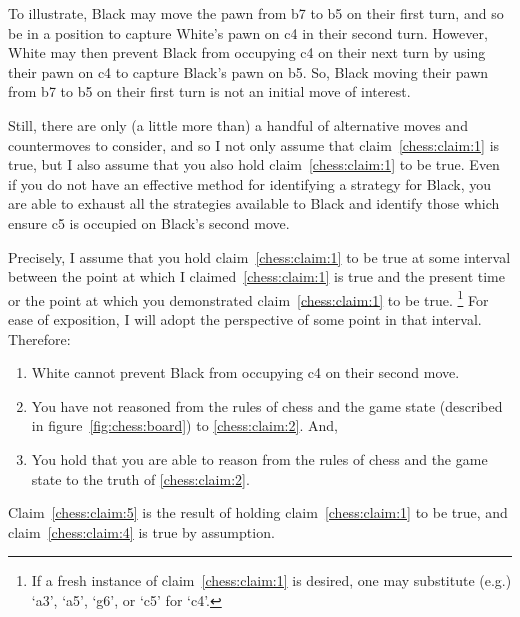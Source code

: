 \documentclass[10pt]{article}
\begin{document}
To illustrate, Black may move the pawn from b7 to b5 on their first turn, and so be in a position to capture White's pawn on c4 in their second turn.
However, White may then prevent Black from occupying c4 on their next turn by using their pawn on c4 to capture Black's pawn on b5.
So, Black moving their pawn from b7 to b5 on their first turn is not an initial move of interest.

Still, there are only (a little more than) a handful of alternative moves and countermoves to consider, and so I not only assume that claim~\ref{chess:claim:1} is true, but I also assume that you also hold claim~\ref{chess:claim:1} to be true.
Even if you do not have an effective method for identifying a strategy for Black, you are able to exhaust all the strategies available to Black and identify those which ensure c5 is occupied on Black's second move.

Precisely, I assume that you hold claim~\ref{chess:claim:1} to be true at some interval between the point at which I claimed~\ref{chess:claim:1} is true and the present time or the point at which you demonstrated claim~\ref{chess:claim:1} to be true.\nolinebreak
\footnote{
  If a fresh instance of claim~\ref{chess:claim:1} is desired, one may substitute (e.g.) `a3', `a5', `g6', or `c5' for `c4'.
}
For ease of exposition, I will adopt the perspective of some point in that interval.
Therefore:
\begin{enumerate}[resume]
\item\label{chess:claim:2} White cannot prevent Black from occupying c4 on their second move.
\item\label{chess:claim:4} You have not reasoned from the rules of chess and the game state (described in figure~\ref{fig:chess:board}) to \ref{chess:claim:2}. And,
\item\label{chess:claim:5} You hold that you are able to reason from the rules of chess and the game state to the truth of \ref{chess:claim:2}.
\end{enumerate}

Claim~\ref{chess:claim:5} is the result of holding claim~\ref{chess:claim:1} to be true, and claim~\ref{chess:claim:4} is true by assumption.
\end{document}
